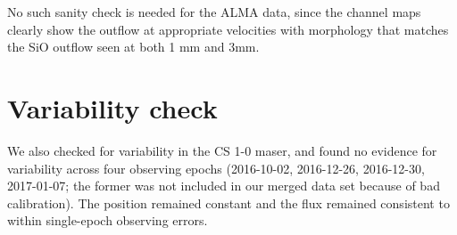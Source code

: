 \documentclass[twocolumn]{aastex62}
\begin{document}
No such sanity check is needed for the ALMA data, since the channel maps clearly
show the outflow at appropriate velocities with morphology that matches the SiO
outflow seen at both 1 mm and 3mm.

\section{Variability check}
We also checked for variability in the CS 1-0 maser, and found no evidence for variability
across four observing epochs (2016-10-02, 2016-12-26, 2016-12-30, 2017-01-07; the
former was not included in our merged data set because of bad calibration).
The position remained constant and the flux remained consistent to within single-epoch
observing errors.


\end{document}
